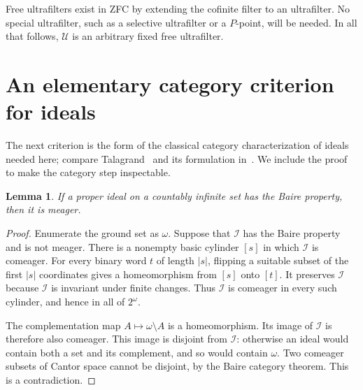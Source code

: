 \documentclass[11pt,a4paper]{article}
\newtheorem{lemma}[theorem]{Lemma}
\theoremstyle{definition}
\theoremstyle{remark}
\newcommand{\I}{\mathcal I}
\newcommand{\U}{\mathcal U}
\begin{document}
Free ultrafilters exist in ZFC by extending the cofinite filter to an
ultrafilter. No special ultrafilter, such as a selective ultrafilter or a
$P$-point, will be needed. In all that follows, $\U$ is an arbitrary
fixed free ultrafilter.

\section{An elementary category criterion for ideals}
\label{sec:category}

The next criterion is the form of the classical category
characterization of ideals needed here; compare
Talagrand~\cite{Talagrand} and its formulation in~\cite[Theorem~1.7]{FT}.
We include the proof to make the category step inspectable.

\begin{lemma}
\label{lem:zeroone}
If a proper ideal on a countably infinite set has the Baire property,
then it is meager.
\end{lemma}
\begin{proof}
Enumerate the ground set as $\omega$. Suppose that $\I$ has the Baire
property and is not meager. There is a nonempty basic cylinder $[s]$ in
which $\I$ is comeager. For every binary word $t$ of length $|s|$, flipping
a suitable subset of the first $|s|$ coordinates gives a homeomorphism
from $[s]$ onto $[t]$. It preserves $\I$ because $\I$ is invariant under
finite changes. Thus $\I$ is comeager in every such cylinder, and hence
in all of $2^\omega$.

The complementation map $A\mapsto\omega\setminus A$ is a
homeomorphism. Its image of $\I$ is therefore also comeager. This image
is disjoint from $\I$: otherwise an ideal would contain both a set and
its complement, and so would contain $\omega$. Two comeager subsets of
Cantor space cannot be disjoint, by the Baire category theorem. This is
a contradiction.
\end{proof}
\end{document}
